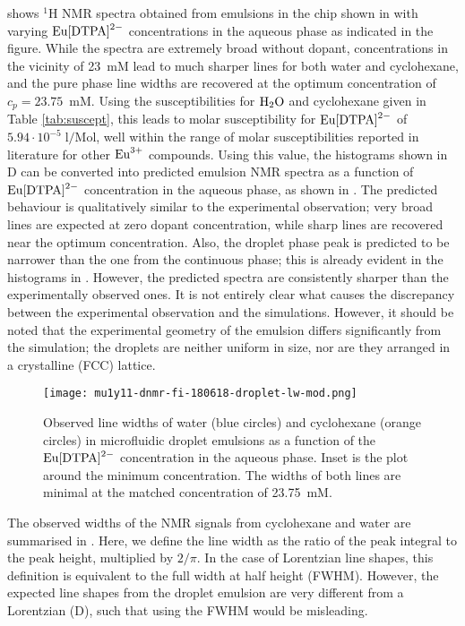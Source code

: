  shows $^1$H NMR spectra obtained from emulsions in the chip
shown in  with varying $\ce{Eu[DTPA]^{2-}}$ concentrations in the aqueous
phase as indicated in the figure. While the spectra are extremely broad without dopant,
concentrations in the vicinity of 23~mM lead to much sharper lines for both water and cyclohexane,
and the pure phase line widths are recovered at the optimum concentration of $c_p=23.75$~mM.
Using the susceptibilities for $\ce{H2O}$ and cyclohexane given in
Table \ref{tab:suscept}, this leads to molar susceptibility for $\ce{Eu[DTPA]^{2-}}$
of $5.94\cdot 10^{-5}\;\mathrm{l/\text{Mol}}$, well within the range
 of molar susceptibilities reported in literature for other $\ce{Eu^{3+}}$
 compounds. Using this value, the histograms
shown in D can be converted into
predicted emulsion NMR spectra as a function of $\ce{Eu[DTPA]^{2-}}$
concentration in the aqueous phase,
as shown in .
The predicted behaviour is qualitatively similar to the experimental observation; very broad
lines are expected at zero dopant concentration, while sharp lines are recovered near the optimum
concentration. Also, the droplet phase peak is predicted to be narrower than the one from the continuous phase; this is already evident
in the histograms in .  However, the predicted spectra are consistently sharper than the experimentally
observed ones.
It is not entirely clear what causes the discrepancy between the experimental observation
and the simulations. However, it should be noted that the experimental geometry of the emulsion
differs significantly from the simulation; the droplets are neither uniform in size, nor are they
arranged in a crystalline (FCC) lattice.


\begin{figure}[h]
  \begin{center}
    \texttt{[image: mu1y11-dnmr-fi-180618-droplet-lw-mod.png]}
  \end{center}
  \caption{Observed line widths of water (blue circles) and
    cyclohexane (orange circles) in microfluidic droplet emulsions
    as a function of the $\ce{Eu[DTPA]^{2-}}$ concentration in the aqueous phase. Inset is the plot around the minimum
    concentration.
    The widths of both lines are minimal
    at the matched concentration of 23.75~mM. }
    \label{fig:line widths}
\end{figure}


The observed widths of the NMR signals from cyclohexane and water
are summarised in . Here, we define the line width as
the ratio of the peak integral to the peak height, multiplied by $2/\pi$. In the
case of Lorentzian line shapes, this definition is equivalent to the full width at half height
(FWHM). However, the expected line shapes from the droplet emulsion are very different
from a Lorentzian (D), such that using the FWHM would be misleading.


